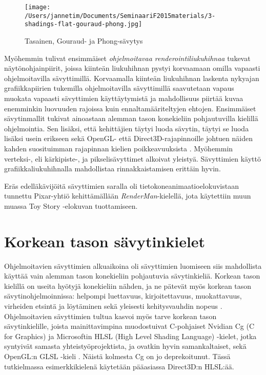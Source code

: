 \documentclass[finnish]{tktltiki2}
\theoremstyle{definition}
\theoremstyle{remark}
\begin{document}
\begin{figure}[!htbp]
\texttt{[image: /Users/jannetim/Documents/SeminaariF2015materials/3-shadings-flat-gouraud-phong.jpg]}
\caption{Tasainen, Gouraud- ja Phong-sävytys}
\label{FGP}
\end{figure}

Myöhemmin tulivat ensimmäiset \emph{ohjelmoitavaa renderointiliukuhihnaa} tukevat näytönohjainpiirit, joissa kiinteän liukuhihnan pystyi korvaamaan omilla vapaasti ohjelmoitavilla sävyttimillä. Korvaamalla kiinteän liukuhihnan laskenta nykyajan grafiikkapiirien tukemilla ohjelmoitavilla sävyttimillä saavutetaan vapaus muokata vapaasti sävyttimien käyttäytymistä ja mahdollisuus piirtää kuvaa enemminkin luovuuden rajoissa kuin ennaltamääriteltyjen ehtojen. Ensimmäiset sävytinmallit tukivat ainoastaan alemman tason konekieliin pohjautuvilla kielillä ohjelmointia. Sen lisäksi, että kehittäjien täytyi luoda sävytin, täytyi se luoda lisäksi usein erikseen sekä OpenGL- että Direct3D-rajapinnoille johtuen näiden kahden suosituimman rajapinnan kielien poikkeavuuksista \cite[s. 174]{She02}. Myöhemmin verteksi-, eli kärkipiste-, ja pikselisävyttimet alkoivat yleistyä. Sävyttimien käyttö grafiikkaliukuhihnalla mahdollistaa rinnakkaistamisen erittäin hyvin. 
\cite{Ake02}

Eräs edelläkävijöitä sävyttimien saralla oli tietokoneanimaatioelokuvistaan tunnettu Pixar-yhtiö kehittämällään \emph{RenderMan}-kielellä, jota käytettiin muun muassa Toy Story -elokuvan tuottamiseen.

\section{Korkean tason sävytinkielet}

Ohjelmoitavien sävyttimien alkuaikoina oli sävyttimien luomiseen siis mahdollista käyttää vain alemman tason konekieliin pohjautuvia sävytinkieliä. Korkean tason kielillä on useita hyötyjä konekieliin nähden, ja ne pätevät myös korkean tason sävytinohjelmoinnissa: helpompi luettavuus, kirjoitettavuus, muokattavuus, virheiden etsintä ja löytäminen sekä yleisesti kehitysvauhdin nopeus \cite{She08}. Ohjelmoitavien sävyttimien tultua kasvoi myös tarve korkean tason sävytinkielille, joista mainittavimpina muodostuivat C-pohjaiset Nvidian Cg (C for Graphics) \cite{Nvi03} ja Microsoftin HLSL (High Level Shading Language) -kielet, jotka syntyivät samasta yhteistyöprojektista, ja ovatkin hyvin samankaltaiset, sekä OpenGL:n GLSL -kieli \cite{Khr15}. Näistä kolmesta Cg on jo deprekoitunut. Tässä tutkielmassa esimerkkikielenä käytetään pääasiassa Direct3D:n HLSL:ää.
\end{document}

